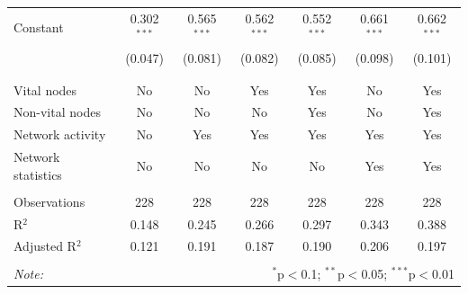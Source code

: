 \begin{table}[!htbp]
\begin{tabular}{@{\extracolsep{5pt}}lcccccc}
 Constant & 0.302$^{***}$ & 0.565$^{***}$ & 0.562$^{***}$ & 0.552$^{***}$ & 0.661$^{***}$ & 0.662$^{***}$ \\ 
  & (0.047) & (0.081) & (0.082) & (0.085) & (0.098) & (0.101) \\ 
  & & & & & & \\ 
\hline \\[-1.8ex] 
Vital nodes & No & No & Yes & Yes & No & Yes \\ 
Non-vital nodes & No & No & No & Yes & No & Yes \\ 
Network activity & No & Yes & Yes & Yes & Yes & Yes \\ 
Network statistics & No & No & No & No & Yes & Yes \\ 
\hline &  &  &  &  &  &  \\ 
Observations & 228 & 228 & 228 & 228 & 228 & 228 \\ 
R$^{2}$ & 0.148 & 0.245 & 0.266 & 0.297 & 0.343 & 0.388 \\ 
Adjusted R$^{2}$ & 0.121 & 0.191 & 0.187 & 0.190 & 0.206 & 0.197 \\ 
\hline 
\hline \\[-1.8ex] 
\textit{Note:}  & \multicolumn{6}{r}{$^{*}$p$<$0.1; $^{**}$p$<$0.05; $^{***}$p$<$0.01} \\ 
\end{tabular} 
\end{table} 
